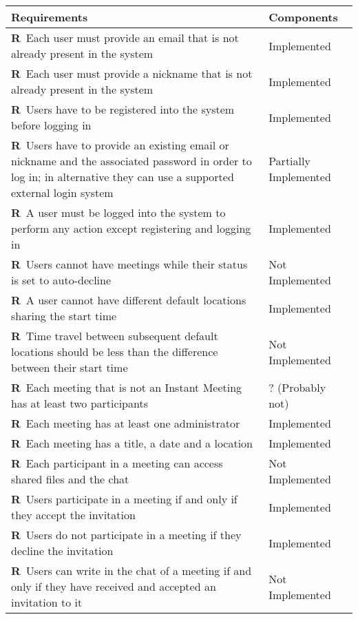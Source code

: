 \begin{longtable}{|m{7cm}|m{7cm}|}
	\hline
	\textbf{Requirements}            & 		\textbf{Components}		    \\ \hline
	\textbf{R\reqNum}~Each user must provide an email that is not already present in the system & Implemented	\\ \hline
	\textbf{R\reqNum}~Each user must provide a nickname that is not already present in the system & Implemented	\\ \hline
	\textbf{R\reqNum}~Users have to be registered into the system before logging in & Implemented	\\ \hline
	\textbf{R\reqNum}~Users have to provide an existing email or nickname and the associated password in order to log in; in alternative they can use a supported external login system & Partially Implemented	\\ \hline
	\textbf{R\reqNum}~A user must be logged into the system to perform any action except registering and logging in & Implemented	\\ \hline
	\textbf{R\reqNum}~Users cannot have meetings while their status is set to auto-decline & Not Implemented	\\ \hline
	\textbf{R\reqNum}~A user cannot have different default locations sharing the start time & Implemented	\\ \hline
	\textbf{R\reqNum}~Time travel between subsequent default locations should be less than the difference between their start time & Not Implemented	\\ \hline
	\textbf{R\reqNum}~Each meeting that is not an Instant Meeting has at least two participants & ? (Probably not)	\\ \hline
	\textbf{R\reqNum}~Each meeting has at least one administrator & Implemented	\\ \hline
	\textbf{R\reqNum}~Each meeting has a title, a date and a location & Implemented	\\ \hline
	\textbf{R\reqNum}~Each participant in a meeting can access shared files and the chat & Not Implemented \\ \hline
	\textbf{R\reqNum}~Users participate in a meeting if and only if they accept the invitation & Implemented	\\ \hline
	\textbf{R\reqNum}~Users do not participate in a meeting if they decline the invitation & Implemented	\\ \hline
	\textbf{R\reqNum}~Users can write in the chat of a meeting if and only if they have received and accepted an invitation to it & Not Implemented	\\ \hline

\end{longtable}
